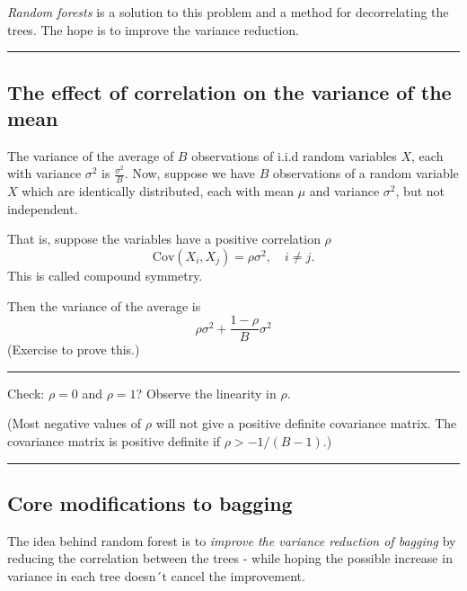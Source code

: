 \documentclass[
  letterpaper,
  DIV=11,
  numbers=noendperiod]{scrartcl}
\begin{document}
\emph{Random forests} is a solution to this problem and a method for
decorrelating the trees. The hope is to improve the variance reduction.

\begin{center}\rule{0.5\linewidth}{0.5pt}\end{center}

\hypertarget{the-effect-of-correlation-on-the-variance-of-the-mean}{%
\subsection{The effect of correlation on the variance of the
mean}\label{the-effect-of-correlation-on-the-variance-of-the-mean}}

The variance of the average of \(B\) observations of i.i.d random
variables \(X\), each with variance \(\sigma^2\) is
\(\frac{\sigma^2}{B}\). Now, suppose we have \(B\) observations of a
random variable \(X\) which are identically distributed, each with mean
\(\mu\) and variance \(\sigma^2\), but not independent.

That is, suppose the variables have a positive correlation \(\rho\)
\[\text{Cov}(X_i, X_j) = \rho \sigma^2, \quad i \neq j.\] This is called
compound symmetry.

Then the variance of the average is
\[\rho \sigma^2+\frac{1-\rho}{B} \sigma^2\] (Exercise to prove this.)

\begin{center}\rule{0.5\linewidth}{0.5pt}\end{center}

Check: \(\rho=0\) and \(\rho=1\)? Observe the linearity in \(\rho\).

(Most negative values of \(\rho\) will not give a positive definite
covariance matrix. The covariance matrix is positive definite if
\(\rho>-1/(B-1)\).)

\begin{center}\rule{0.5\linewidth}{0.5pt}\end{center}

\hypertarget{core-modifications-to-bagging}{%
\subsection{Core modifications to
bagging}\label{core-modifications-to-bagging}}

The idea behind random forest is to \emph{improve the variance reduction
of bagging} by reducing the correlation between the trees - while hoping
the possible increase in variance in each tree doesn´t cancel the
improvement.
\end{document}
